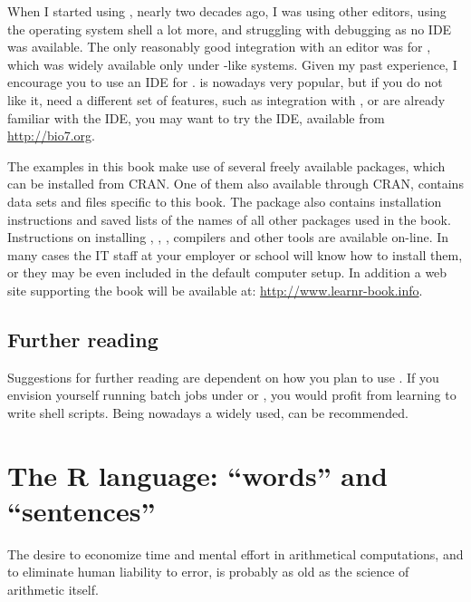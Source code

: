 \documentclass[krantz2]{krantz}\usepackage{knitr}%
\begin{document}
When I started using \Rpgrm, nearly two decades ago, I was using other editors, using the operating system shell a lot more, and struggling with debugging as no IDE was available. The only reasonably good integration with an editor was for , which was widely available only under -like systems. Given my past experience, I encourage you to use an IDE for \Rpgrm. \RStudio is nowadays very popular, but if you do not like it, need a different set of features, such as integration with , or are already familiar with the  IDE, you may want to try the  IDE, available from \url{http://bio7.org}.

The examples in this book make use of several freely available packages, which can be installed from CRAN. One of them  also available through CRAN, contains data sets and files specific to this book. The  package also contains installation instructions and saved lists of the names of all other packages used in the book. Instructions on installing \Rpgrm, , \RStudio, compilers and other tools are available on-line. In many cases the IT staff at your employer or school will know how to install them, or they may be even included in the default computer setup. In addition a web site supporting the book will be available at: \url{http://www.learnr-book.info}.

\section{Further reading}
Suggestions for further reading are dependent on how you plan to use \Rlang. If you envision yourself running batch jobs under  or , you would profit from learning to write shell scripts. Being  nowadays a widely used,  \autocite{Newham2005} can be recommended.








\chapter{The R language: ``words'' and ``sentences''}\label{chap:R:as:calc}

\begin{VF}
The desire to economize time and mental effort in arithmetical computations, and to eliminate human liability to error, is probably as old as the science of arithmetic itself.

\end{VF}
\end{document}
